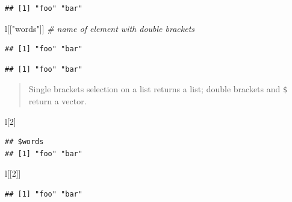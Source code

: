 \documentclass[]{book}
\newenvironment{Shaded}{\begin{snugshade}}{\end{snugshade}}
\newcommand{\CommentTok}[1]{\textcolor[rgb]{0.56,0.35,0.01}{\textit{#1}}}
\newcommand{\DecValTok}[1]{\textcolor[rgb]{0.00,0.00,0.81}{#1}}
\newcommand{\NormalTok}[1]{#1}
\newcommand{\OperatorTok}[1]{\textcolor[rgb]{0.81,0.36,0.00}{\textbf{#1}}}
\newcommand{\StringTok}[1]{\textcolor[rgb]{0.31,0.60,0.02}{#1}}
\begin{document}
\begin{verbatim}
## [1] "foo" "bar"
\end{verbatim}

\begin{Shaded}
\begin{Highlighting}[]
\NormalTok{l[[}\StringTok{"words"}\NormalTok{]]  }\CommentTok{# name of element with double brackets}
\end{Highlighting}
\end{Shaded}

\begin{verbatim}
## [1] "foo" "bar"
\end{verbatim}

\begin{Shaded}
\end{Shaded}

\begin{verbatim}
## [1] "foo" "bar"
\end{verbatim}

\begin{quote}
Single brackets selection on a list returns a list; double brackets and \texttt{\$} return a vector.
\end{quote}

\begin{Shaded}
\begin{Highlighting}[]
\NormalTok{l[}\DecValTok{2}\NormalTok{]}
\end{Highlighting}
\end{Shaded}

\begin{verbatim}
## $words
## [1] "foo" "bar"
\end{verbatim}

\begin{Shaded}
\begin{Highlighting}[]
\NormalTok{l[[}\DecValTok{2}\NormalTok{]]}
\end{Highlighting}
\end{Shaded}

\begin{verbatim}
## [1] "foo" "bar"
\end{verbatim}

\begin{Shaded}
\end{Shaded}
\end{document}
